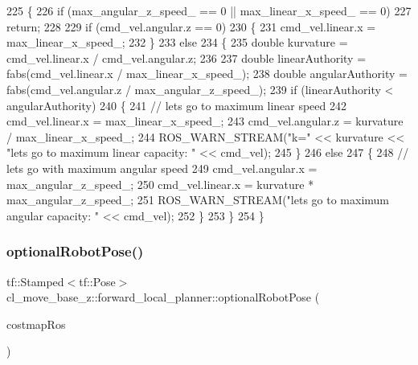 \begin{DoxyCode}
225 \{
226     \textcolor{keywordflow}{if} (max\_angular\_z\_speed\_ == 0 || max\_linear\_x\_speed\_ == 0)
227         \textcolor{keywordflow}{return};
228 
229     \textcolor{keywordflow}{if} (cmd\_vel.angular.z == 0)
230     \{
231         cmd\_vel.linear.x = max\_linear\_x\_speed\_;
232     \}
233     \textcolor{keywordflow}{else}
234     \{
235         \textcolor{keywordtype}{double} kurvature = cmd\_vel.linear.x / cmd\_vel.angular.z;
236 
237         \textcolor{keywordtype}{double} linearAuthority = fabs(cmd\_vel.linear.x / max\_linear\_x\_speed\_);
238         \textcolor{keywordtype}{double} angularAuthority = fabs(cmd\_vel.angular.z / max\_angular\_z\_speed\_);
239         \textcolor{keywordflow}{if} (linearAuthority < angularAuthority)
240         \{
241             \textcolor{comment}{// lets go to maximum linear speed}
242             cmd\_vel.linear.x = max\_linear\_x\_speed\_;
243             cmd\_vel.angular.z = kurvature / max\_linear\_x\_speed\_;
244             ROS\_WARN\_STREAM(\textcolor{stringliteral}{"k="} << kurvature << \textcolor{stringliteral}{"lets go to maximum linear capacity: "} << cmd\_vel);
245         \}
246         \textcolor{keywordflow}{else}
247         \{
248             \textcolor{comment}{// lets go with maximum angular speed}
249             cmd\_vel.angular.x = max\_angular\_z\_speed\_;
250             cmd\_vel.linear.x = kurvature * max\_angular\_z\_speed\_;
251             ROS\_WARN\_STREAM(\textcolor{stringliteral}{"lets go to maximum angular capacity: "} << cmd\_vel);
252         \}
253     \}
254 \}
\end{DoxyCode}
\mbox{\label{namespacecl__move__base__z_1_1forward__local__planner_a4c20f9fe0ca67779c53e90182baf4997}} 
\subsubsection{\texorpdfstring{optional\+Robot\+Pose()}{optionalRobotPose()}}
{\footnotesize\ttfamily tf\+::\+Stamped$<$tf\+::\+Pose$>$ cl\+\_\+move\+\_\+base\+\_\+z\+::forward\+\_\+local\+\_\+planner\+::optional\+Robot\+Pose (\begin{DoxyParamCaption}\item[{costmap\+\_\+2d\+::\+Costmap2\+D\+R\+OS $\ast$}]{costmap\+Ros }\end{DoxyParamCaption})}



